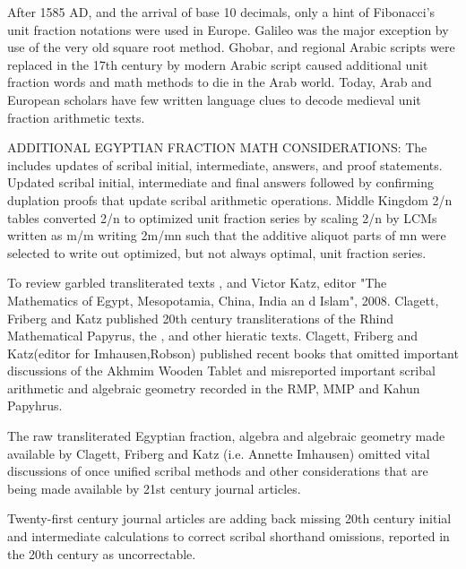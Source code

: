 \documentclass[12pt]{article}
\begin{document}
After 1585 AD, and the arrival of base 10 decimals, only a hint of Fibonacci's unit fraction notations were used in Europe. Galileo was the major exception by use of the very old square root method.  Ghobar, and regional Arabic scripts were replaced in the 17th century by modern Arabic script caused additional unit fraction words and math methods to die in the Arab world. Today, Arab and European scholars have few written language clues to decode medieval unit fraction arithmetic texts.  

ADDITIONAL EGYPTIAN FRACTION MATH CONSIDERATIONS: The  includes updates of scribal initial, intermediate, answers, and proof statements. Updated scribal initial, intermediate and final answers followed by confirming duplation proofs that update scribal arithmetic operations. Middle Kingdom 2/n tables converted 2/n to optimized unit fraction series by scaling 2/n by LCMs written as m/m writing 2m/mn such that the additive aliquot parts of mn were selected to write out optimized, but not always optimal, unit fraction series. 

To review garbled transliterated texts ,  and Victor Katz, editor "The Mathematics of Egypt, Mesopotamia, China, India an d Islam", 2008. Clagett, Friberg and Katz published 20th century transliterations of the Rhind Mathematical Papyrus, the , and other hieratic texts. Clagett, Friberg and Katz(editor for Imhausen,Robson) published recent books that omitted important discussions of the Akhmim Wooden Tablet and misreported important scribal arithmetic and algebraic geometry recorded in the RMP, MMP and Kahun Papyhrus.

The raw transliterated Egyptian fraction, algebra and algebraic geometry made available by Clagett, Friberg and Katz (i.e. Annette Imhausen) omitted vital discussions of once unified scribal methods and other considerations that are being made available by 21st century journal articles.

Twenty-first century journal articles are adding back missing 20th century initial and intermediate calculations to correct scribal shorthand omissions, reported in the 20th century as uncorrectable. 
\end{document}
